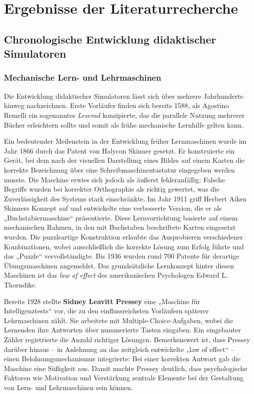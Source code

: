 \chapter{Ergebnisse der Literaturrecherche}\label{results}

\section{Chronologische Entwicklung didaktischer Simulatoren}

\subsection{Mechanische Lern- und Lehrmaschinen}

Die Entwicklung didaktischer Simulatoren lässt sich über mehrere Jahrhunderte hinweg nachzeichnen. Erste Vorläufer finden sich bereits 1588, als Agostino Remelli ein sogenanntes \textit{Leserad} konzipierte, das die parallele Nutzung mehrerer Bücher erleichtern sollte und somit als frühe mechanische Lernhilfe gelten kann.\parencite{cayetano_geschichte_2022}

Ein bedeutender Meilenstein in der Entwicklung früher Lernmaschinen wurde im Jahr 1866 durch das Patent von Halycon Skinner gesetzt. Er konstruierte ein Gerät, bei dem nach der visuellen Darstellung eines Bildes auf einem Kasten die korrekte Bezeichnung über eine Schreibmaschinentastatur eingegeben werden musste. Die Maschine erwies sich jedoch als äußerst fehleranfällig: Falsche Begriffe wurden bei korrekter Orthographie als richtig gewertet, was die Zuverlässigkeit des Systems stark einschränkte. Im Jahr 1911 griff Herbert Aiken Skinners Konzept auf und entwickelte eine verbesserte Version, die er als „Buchstabiermaschine“ präsentierte. Diese Lernvorrichtung basierte auf einem mechanischen Rahmen, in den mit Buchstaben beschriftete Karten eingesetzt wurden. Die puzzleartige Konstruktion erlaubte das Ausprobieren verschiedener Kombinationen, wobei ausschließlich die korrekte Lösung zum Erfolg führte und das „Puzzle“ vervollständigte. Bis 1936 wurden rund 700 Patente für derartige Übungsmaschinen angemeldet. Das grundsätzliche Lernkonzept hinter diesen Maschinen ist das \textit{law of effect} des amerikanischen Psychologen Edward L. Thorndike.\parencite[S.~3]{niegemann_kompendium_2008}

Bereits 1928 stellte \textbf{Sidney Leavitt Pressey} eine „Maschine für Intelligenztests“ vor, die zu den einflussreichsten Vorläufern späterer Lehrmaschinen zählt. Sie arbeitete mit Multiple-Choice-Aufgaben, wobei die Lernenden ihre Antworten über nummerierte Tasten eingaben. Ein eingebauter Zähler registrierte die Anzahl richtiger Lösungen. Bemerkenswert ist, dass Pressey darüber hinaus -- in Anlehnung an das zeitgleich entwickelte „law of effect“ -- einen Belohnungsmechanismus integrierte: Bei einer korrekten Antwort gab die Maschine eine Süßigkeit aus. Damit machte Pressey deutlich, dass psychologische Faktoren wie Motivation und Verstärkung zentrale Elemente bei der Gestaltung von Lern- und Lehrmaschinen sein können.\parencite[S.~705]{benjamin_history_1988}\parencite[S.~969f]{skinner_teaching_1958}

